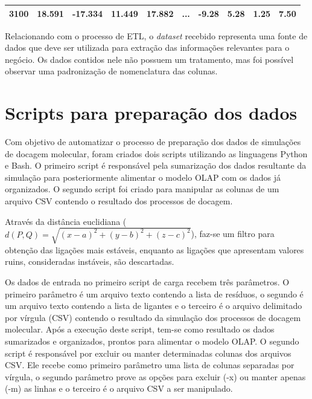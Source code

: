 \begin{table}[h]
\begin{tabular}{c|l|l|l|l|l|l|l|l|l}
\textbf{3100} & 18.591                                     & -17.334                                    & 11.449                                     & 17.882                                      & ...                               & -9.28                                    & 5.28                                      & 1.25                                     & 7.50                                     \\ \hline
\end{tabular}
\end{table}

Relacionando com o processo de ETL, o \emph{dataset} recebido representa uma fonte de dados que deve ser utilizada para extração das informações relevantes para o negócio. Os dados contidos nele não possuem um tratamento, mas foi possível observar uma padronização de nomenclatura das colunas.

\section{Scripts para preparação dos dados}

Com objetivo de automatizar o processo de preparação dos dados de simulações de docagem molecular, foram criados dois scripts utilizando as linguagens Python e Bash. O primeiro script é responsável pela sumarização dos dados resultante da simulação para posteriormente alimentar o modelo OLAP com os dados já organizados. O segundo script foi criado para manipular as colunas de um arquivo CSV contendo o resultado dos processos de docagem.

Através da distância euclidiana ($d(P, Q)= \sqrt{(x - a)^{2} +(y - b)^{2} + (z - c)^{2}}$), faz-se um filtro para obtenção das ligações mais estáveis, enquanto as ligações que apresentam valores ruins, consideradas instáveis, são descartadas.

Os dados de entrada no primeiro script de carga recebem três parâmetros. O primeiro parâmetro é um arquivo texto contendo a lista de resíduos, o segundo é um arquivo texto contendo a lista de ligantes e o terceiro é o arquivo delimitado por vírgula (CSV) contendo o resultado da simulação dos processos de docagem molecular. Após a execução deste script, tem-se como resultado os dados sumarizados e organizados, prontos para alimentar o modelo OLAP. O segundo script é responsável por excluir ou manter determinadas colunas dos arquivos CSV. Ele recebe como primeiro parâmetro uma lista de colunas separadas por vírgula, o segundo parâmetro prove as opções para excluir (-x) ou manter apenas (-m) as linhas e o terceiro é o arquivo CSV a ser manipulado.

